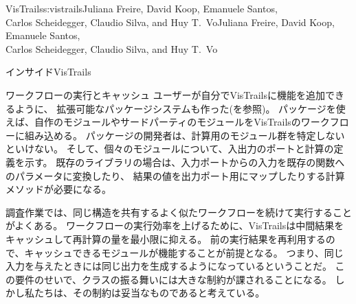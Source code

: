 \begin{aosachaptertoc}{VisTrails}{s:vistrails}{Juliana Freire, David Koop, Emanuele Santos, \\ Carlos Scheidegger, Claudio Silva, and Huy T.\ Vo}{Juliana Freire, David Koop, Emanuele Santos, \\ \hspace*{0.9cm} Carlos Scheidegger, Claudio Silva, and Huy T.\ Vo}
\begin{aosasect1}{インサイドVisTrails}
\begin{aosasect2}{ワークフローの実行とキャッシュ}
ユーザーが自分でVisTrailsに機能を追加できるように、
拡張可能なパッケージシステムも作った(を参照)。
パッケージを使えば、自作のモジュールやサードパーティのモジュールをVisTrailsのワークフローに組み込める。
パッケージの開発者は、計算用のモジュール群を特定しないといけない。
そして、個々のモジュールについて、入出力のポートと計算の定義を示す。
既存のライブラリの場合は、入力ポートからの入力を既存の関数へのパラメータに変換したり、
結果の値を出力ポート用にマップしたりする計算メソッドが必要になる。

調査作業では、同じ構造を共有するよく似たワークフローを続けて実行することがよくある。
ワークフローの実行効率を上げるために、VisTrailsは中間結果をキャッシュして再計算の量を最小限に抑える。
前の実行結果を再利用するので、キャッシュできるモジュールが機能することが前提となる。
つまり、同じ入力を与えたときには同じ出力を生成するようになっているということだ。
この要件のせいで、クラスの振る舞いには大きな制約が課されることになる。
しかし私たちは、その制約は妥当なものであると考えている。


\end{aosasect2}
\end{aosasect1}
\end{aosachaptertoc}

